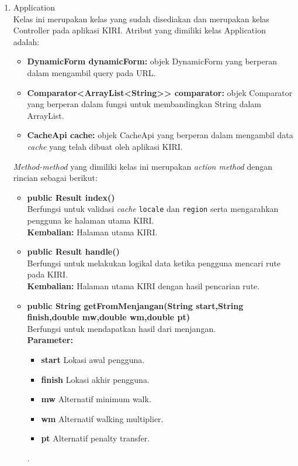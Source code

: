 \begin{enumerate}
	\item Application\\
	Kelas ini merupakan kelas yang sudah disediakan \play dan merupakan kelas Controller pada aplikasi KIRI. Atribut yang dimiliki kelas Application adalah:
	\begin{itemize}
		\item \textbf{DynamicForm dynamicForm:} objek DynamicForm yang berperan dalam mengambil query pada URL. 
		\item \textbf{Comparator<ArrayList<String>{}> comparator:} objek Comparator yang berperan dalam fungsi untuk membandingkan String dalam ArrayList.
		\item \textbf{CacheApi cache:} objek CacheApi yang berperan dalam mengambil data \textit{cache} yang telah dibuat oleh aplikasi KIRI.
		
	\end{itemize}
	\textit{Method-method} yang dimiliki kelas ini merupakan \textit{action method} dengan rincian sebagai berikut:
	\begin{itemize}
		\item \textbf{public Result index()}\\
		Berfungsi untuk validasi \textit{cache} \verb!locale! dan \verb!region! serta mengarahkan pengguna ke halaman utama KIRI.\\
		\textbf{Kembalian:}  Halaman utama KIRI.
		
		\item \textbf{public Result handle()}\\
		Berfungsi untuk melakukan logikal data ketika pengguna mencari rute pada KIRI.\\
		\textbf{Kembalian:}  Halaman utama KIRI dengan hasil pencarian rute.
		
		\item \textbf{public String getFromMenjangan(String start,String finish,double mw,double wm,double pt)}\\
		Berfungsi untuk mendapatkan hasil dari menjangan.\\
		\textbf{Parameter:}
				\begin{itemize}
					\item \textbf{start} Lokasi awal pengguna.
					\item \textbf{finish} Lokasi akhir pengguna.
					\item \textbf{mw} Alternatif minimum walk.
					\item \textbf{wm} Alternatif walking multiplier.
					\item \textbf{pt} Alternatif penalty transfer.
				\end{itemize}.
				

\end{itemize}
\end{enumerate}
